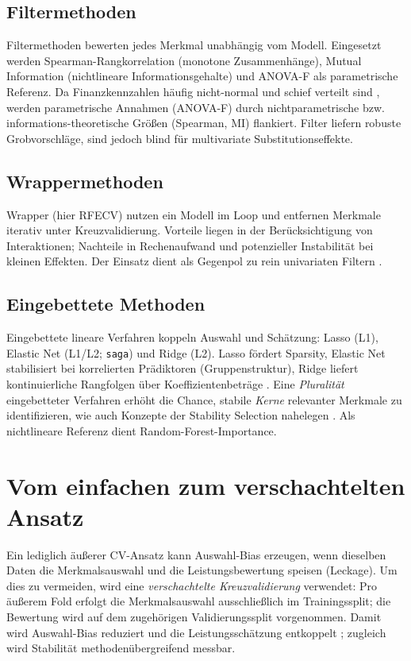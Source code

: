 \subsection{Filtermethoden}
Filtermethoden bewerten jedes Merkmal unabhängig vom Modell. Eingesetzt werden Spearman-Rangkorrelation (monotone Zusammenhänge), Mutual Information (nichtlineare Informationsgehalte) und ANOVA-F als parametrische Referenz. Da Finanzkennzahlen häufig nicht-normal und schief verteilt sind \parencite{mcleay2000prediction}, werden parametrische Annahmen (ANOVA-F) durch nichtparametrische bzw. informations-theoretische Größen (Spearman, MI) flankiert. Filter liefern robuste Grobvorschläge, sind jedoch blind für multivariate Substitutionseffekte.

\subsection{Wrappermethoden}
Wrapper (hier RFECV) nutzen ein Modell im Loop und entfernen Merkmale iterativ unter Kreuzvalidierung. Vorteile liegen in der Berücksichtigung von Interaktionen; Nachteile in Rechenaufwand und potenzieller Instabilität bei kleinen Effekten. Der Einsatz dient als Gegenpol zu rein univariaten Filtern \parencite{guyon2003introduction}.

\subsection{Eingebettete Methoden}
Eingebettete lineare Verfahren koppeln Auswahl und Schätzung: Lasso (L1), Elastic Net (L1/L2; \texttt{saga}) und Ridge (L2). Lasso fördert Sparsity, Elastic Net stabilisiert bei korrelierten Prädiktoren (Gruppenstruktur), Ridge liefert kontinuierliche Rangfolgen über Koeffizientenbeträge \parencite{hastieelementsstatistical2009}. Eine \emph{Pluralität} eingebetteter Verfahren erhöht die Chance, stabile \emph{Kerne} relevanter Merkmale zu identifizieren, wie auch Konzepte der Stability Selection nahelegen \parencite{meinshausen2010stability}. Als nichtlineare Referenz dient Random-Forest-Importance.

\section{Vom einfachen zum verschachtelten Ansatz}
Ein lediglich äußerer CV-Ansatz kann Auswahl-Bias erzeugen, wenn dieselben Daten die Merkmalsauswahl und die Leistungsbewertung speisen (Leckage). Um dies zu vermeiden, wird eine \emph{verschachtelte Kreuzvalidierung} verwendet: Pro äußerem Fold erfolgt die Merkmalsauswahl ausschließlich im Trainingssplit; die Bewertung wird auf dem zugehörigen Validierungssplit vorgenommen. Damit wird Auswahl-Bias reduziert und die Leistungsschätzung entkoppelt \parencite{cawley2010overfitting,varma2006bias}; zugleich wird Stabilität methodenübergreifend messbar.

